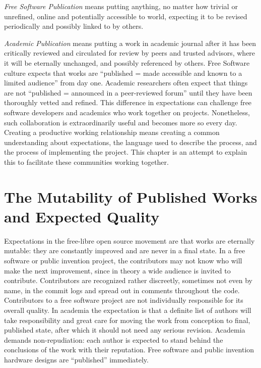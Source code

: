 \documentclass[
	fontsize=10pt, %
	twoside=false, %
	secnumdepth=1, %
]{kaobook}
\begin{document}
{\em Free Software Publication} means putting
anything, no matter how trivial or unrefined, online and potentially
accessible to world, expecting it to be revised periodically and
possibly linked to by others.

{\em Academic Publication} means putting a
work in academic journal after it has been critically reviewed and
circulated for review by peers and trusted advisors, where it will be
eternally unchanged, and possibly referenced by others.  Free Software
culture expects that works are “published = made accessible and known
to a limited audience” from day one. Academic researchers often expect
that things are not “published = announced in a peer-reviewed forum”
until they have been thoroughly vetted and refined. This difference in
expectations can challenge free software developers and academics who
work together on projects. Nonetheless, such collaboration is
extraordinarily useful and becomes more so every day. Creating a
productive working relationship means creating a common understanding
about expectations, the language used to describe the process, and the
process of implementing the project.  This chapter is an attempt to
explain this to facilitate these communities working together.

\section{The Mutability of Published Works and Expected Quality}

Expectations in the free-libre open source movement are that works are eternally mutable: they are
constantly improved and are never in a final state. In a free software
or public invention
project, the contributors may not know who will make the next
improvement, since in theory a wide audience is invited to
contribute. Contributors are recognized rather discreetly, sometimes
not even by name, in the commit logs and spread out in comments
throughout the code. Contributors to a free software project are not
individually responsible for its overall quality.  In academia the
expectation is that a definite list of authors will take
responsibility and great care for moving the work from conception to
final, published state, after which it should not need any serious
revision. Academia demands non-repudiation: each author is expected to
stand behind the conclusions of the work with their reputation.  Free
software and public invention hardware designs are “published” immediately.
\end{document}
